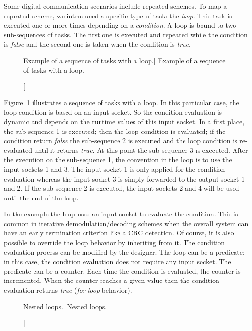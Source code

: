 Some digital communication scenarios include repeated schemes. To map a repeated
scheme, we introduced a specific type of task: the \emph{loop}. This task is
executed one or more times depending on a \emph{condition}. A loop is bound to
two sub-sequences of tasks. The first one is executed and repeated while the
condition is \emph{false} and the second one is taken when the condition is
\emph{true}.

\begin{figure}[htp]
  \centering
  \caption
    [Example of a sequence of tasks with a loop.]
    {Example of a sequence of tasks with a loop.}
  \label{fig:sdr_dsl_loop}
\end{figure}

Figure~\ref{fig:sdr_dsl_loop} illustrates a sequence of tasks with a loop. In
this particular case, the loop condition is based on an input socket. So the
condition evaluation is dynamic and depends on the runtime values of this input
socket. In a first place, the sub-sequence 1 is executed; then the loop
condition is evaluated; if the condition return \emph{false} the sub-sequence 2
is executed and the loop condition is re-evaluated until it returns \emph{true}.
At this point the sub-sequence 3 is executed. After the execution on the
sub-sequence 1, the convention in the loop is to use the input sockets 1 and 3.
The input socket 1 is only applied for the condition evaluation whereas the
input socket 3 is simply forwarded to the output socket 1 and 2. If the
sub-sequence 2 is executed, the input sockets 2 and 4 will be used until the end
of the loop.

In the example the loop uses an input socket to evaluate the condition. This is
common in iterative demodulation/decoding schemes when the overall system can
have an early termination criterion like a CRC detection. Of course, it is also
possible to override the loop behavior by inheriting from it. The condition
evaluation process can be modified by the designer. The loop can be a predicate:
in this case, the condition evaluation does not require any input socket. The
predicate can be a counter. Each time the condition is evaluated, the counter is
incremented. When the counter reaches a given value then the condition
evaluation returns \emph{true} (\emph{for-loop} behavior).

\begin{figure}[htp]
  \centering
  \caption
    [Nested loops.]
    {Nested loops.}
  \label{fig:sdr_dsl_nested_loop}
\end{figure}

